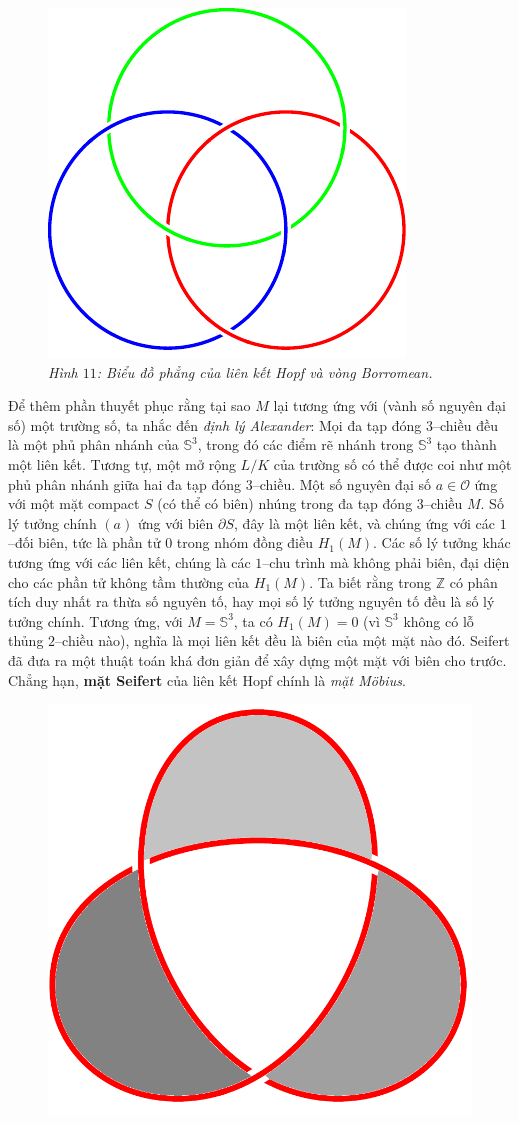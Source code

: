 \begin{multicols}{2}
\begin{figure}[H]
		\includegraphics[width= 0.38\linewidth]{borromean.pdf}
		\caption{\small\textit{\color{duongvaotoanhoc}Hình $11$: Biểu đồ phẳng của liên kết Hopf và vòng Borromean.}}
		\vspace*{-10pt}
	\end{figure}
	Để thêm phần thuyết phục rằng tại sao $M$ lại tương ứng với (vành số nguyên đại số) một trường số, ta nhắc đến {\it định lý Alexander}: Mọi đa tạp đóng $3$--chiều đều là một phủ phân nhánh của $\mathbb{S}^3$, trong đó các điểm rẽ nhánh trong $\mathbb{S}^3$ tạo thành một liên kết. Tương tự, một mở rộng $L/K$ của trường số có thể được coi như một phủ phân nhánh giữa hai đa tạp đóng $3$--chiều.
	\vskip 0.1cm
	Một số nguyên đại số $a \in \mathcal{O}$ ứng với một mặt compact $S$ (có thể có biên) nhúng trong đa tạp đóng $3$--chiều $M$. Số lý tưởng chính $(a)$ ứng với biên $\partial S$, đây là một liên kết, và chúng ứng với các $1$--đối biên, tức là phần tử $0$ trong nhóm đồng điều $H_1(M)$. Các số lý tưởng khác tương ứng với các liên kết, chúng là các $1$--chu trình mà không phải biên, đại diện cho các phần tử không tầm thường của $H_1(M)$. Ta biết rằng trong $\mathbb{Z}$ có phân tích duy nhất ra thừa số nguyên tố, hay mọi số lý tưởng nguyên tố đều là số lý tưởng chính. Tương ứng, với $M = \mathbb{S}^3$, ta có $H_1(M) = 0$ (vì $\mathbb{S}^3$ không có lỗ thủng $2$--chiều nào), nghĩa là mọi liên kết đều là biên của một mặt nào đó. Seifert đã đưa ra một thuật toán khá đơn giản để xây dựng một mặt với biên cho trước. Chẳng hạn, {\bf\color{duongvaotoanhoc} mặt Seifert} của liên kết Hopf chính là {\it mặt M\"obius}.
	\begin{figure}[H]
		\vspace*{-5pt}
		\centering
		\captionsetup{labelformat= empty, justification=centering}
		\includegraphics[width= 0.4\linewidth]{seifert1}\quad\quad

\end{figure}
\end{multicols}

